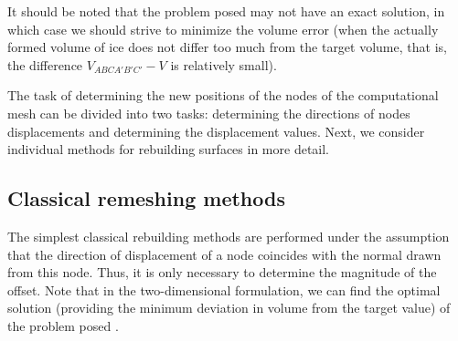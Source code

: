 \documentclass[
11pt,
tightenlines,
twoside,
onecolumn,
nofloats,
nobibnotes,
nofootinbib,
superscriptaddress,
noshowpacs,
centertags]
{revtex4}
\begin{document}
It should be noted that the problem posed may not have an exact solution, in which case we should strive to minimize the volume error (when the actually formed volume of ice does not differ too much from the target volume, that is, the difference $V_{ABCA'B'C'} - V$ is relatively small).

The task of determining the new positions of the nodes of the computational mesh can be divided into two tasks: determining the directions of nodes displacements and determining the displacement values.
Next, we consider individual methods for rebuilding surfaces in more detail.

\subsection{Classical remeshing methods}

The simplest classical rebuilding methods are performed under the assumption that the direction of displacement of a node coincides with the normal drawn from this node.
Thus, it is only necessary to determine the magnitude of the offset.
Note that in the two-dimensional formulation, we can find the optimal solution (providing the minimum deviation in volume from the target value) of the problem posed \cite{Rybakov_2D}.
\end{document}
